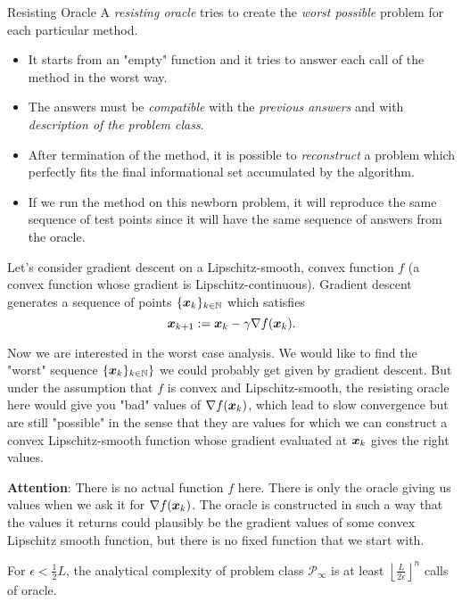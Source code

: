\begin{boxnote}{Resisting Oracle}
    A \emph{resisting oracle} tries to create the \emph{worst possible} problem for each particular method.
    \begin{itemize}
        \item It starts from an "empty" function and it tries to answer each call of the method in the worst way.
        \item The answers must be \emph{compatible} with the \emph{previous answers} and with \emph{description of the problem class}.
        \item After termination of the method, it is possible to \emph{reconstruct} a problem which perfectly fits the final informational set accumulated by the algorithm.
        \item If we run the method on this newborn problem, it will reproduce the same sequence of test points since it will have the same sequence of answers from the oracle.
    \end{itemize}
\end{boxnote}

\begin{example}
    Let's consider gradient descent on a Lipschitz-smooth, convex function \(f\) (a convex function whose gradient is Lipschitz-continuous). Gradient descent generates a sequence 
    of points \(\{\bm{x}_k\}_{k \in \mathbb{N}}\) which satisfies
    \[
        \bm{x}_{k+1} := \bm{x}_{k} - \gamma \nabla f(\bm{x}_{k}).
    \]

    Now we are interested in the worst case analysis. We would like to find the "worst" sequence \(\{\bm{x}_k\}_{k \in \mathbb{N}}\}\) we could probably get given by gradient descent.
    But under the assumption that \(f\) is convex and Lipschitz-smooth, the resisting oracle here would give you "bad" values of \(\nabla f(\bm{x}_k)\), which lead to slow convergence but
    are still "possible" in the sense that they are values for which we can construct a convex Lipschitz-smooth function whose gradient evaluated at \(\bm{x}_k\) gives the right values.

    \textbf{Attention}: There is no actual function \(f\) here.  There is only the oracle giving us values when we ask it for \(\nabla f(\bm{x}_k)\). The oracle is constructed in such a way 
    that the values it returns could plausibly be the gradient values of some convex Lipschitz smooth function, but there is no fixed function that we start with.
\end{example}

\begin{thm}\label{thm:lower_complexity_of_grid}
    For \(\epsilon < \frac{1}{2}L\), the analytical complexity of problem class \(\mathscr{P}_\infty\) is at least \(\left\lfloor \frac{L}{2\epsilon} \right\rfloor^n\) calls of oracle.
\end{thm}

